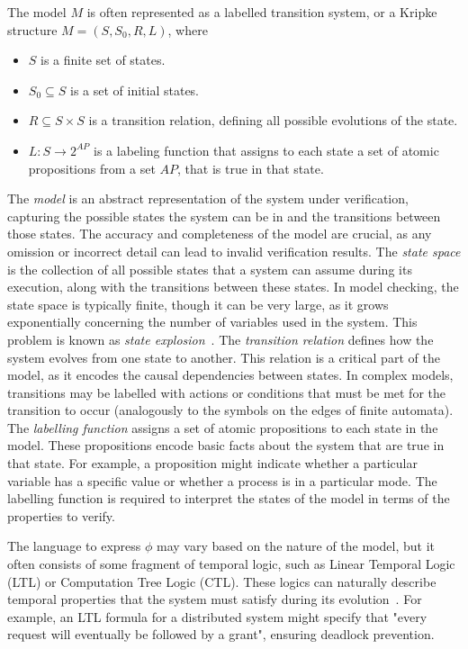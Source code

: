 The model $M$ is often represented as a labelled transition system, or a Kripke structure $M = (S, S_0, R, L)$, where
\begin{itemize}
    \item $S$ is a finite set of states.
    \item $S_0 \subseteq S$ is a set of initial states.
    \item $R \subseteq S \times S$ is a transition relation, defining all possible evolutions of the state.
    \item $L: S \rightarrow 2^{AP}$ is a labeling function that assigns to each state a set of atomic propositions from a set $AP$, that is true in that state.
\end{itemize}
The \textit{model} is an abstract representation of the system under verification, capturing the possible states the system can be in and the transitions between those states. The accuracy and completeness of the model are crucial, as any omission or incorrect detail can lead to invalid verification results. The \textit{state space} is the collection of all possible states that a system can assume during its execution, along with the transitions between these states. In model checking, the state space is typically finite, though it can be very large, as it grows exponentially concerning the number of variables used in the system. This problem is known as \textit{state explosion}~\cite{stateexplosion}. The \textit{transition relation} defines how the system evolves from one state to another. This relation is a critical part of the model, as it encodes the causal dependencies between states. In complex models, transitions may be labelled with actions or conditions that must be met for the transition to occur (analogously to the symbols on the edges of finite automata). The \textit{labelling function} assigns a set of atomic propositions to each state in the model. These propositions encode basic facts about the system that are true in that state. For example, a proposition might indicate whether a particular variable has a specific value or whether a process is in a particular mode. The labelling function is required to interpret the states of the model in terms of the properties to verify.

The language to express $\phi$ may vary based on the nature of the model, but it often consists of some fragment of temporal logic, such as Linear Temporal Logic (LTL) or Computation Tree Logic (CTL). These logics can naturally describe temporal properties that the system must satisfy during its evolution~\cite{temporallogics}. For example, an LTL formula for a distributed system might specify that "every request will eventually be followed by a grant", ensuring deadlock prevention.

